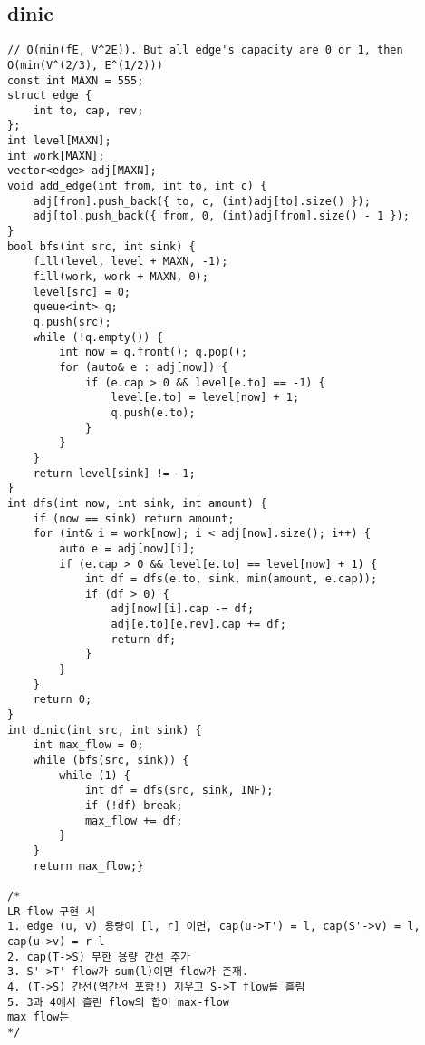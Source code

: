 \documentclass[landscape, 8pt, a4paper, oneside, twocolumn]{extarticle}
\begin{document}
\subsection {dinic}
\begin{verbatim}
// O(min(fE, V^2E)). But all edge's capacity are 0 or 1, then O(min(V^(2/3), E^(1/2)))
const int MAXN = 555;
struct edge {
    int to, cap, rev;
};
int level[MAXN];
int work[MAXN];
vector<edge> adj[MAXN];
void add_edge(int from, int to, int c) {
    adj[from].push_back({ to, c, (int)adj[to].size() });
    adj[to].push_back({ from, 0, (int)adj[from].size() - 1 });
}
bool bfs(int src, int sink) {
    fill(level, level + MAXN, -1);
    fill(work, work + MAXN, 0);
    level[src] = 0;
    queue<int> q;
    q.push(src);
    while (!q.empty()) {
        int now = q.front(); q.pop();
        for (auto& e : adj[now]) {
            if (e.cap > 0 && level[e.to] == -1) {
                level[e.to] = level[now] + 1;
                q.push(e.to);
            }
        }
    }
    return level[sink] != -1;
}
int dfs(int now, int sink, int amount) {
    if (now == sink) return amount;
    for (int& i = work[now]; i < adj[now].size(); i++) {
        auto e = adj[now][i];
        if (e.cap > 0 && level[e.to] == level[now] + 1) {
            int df = dfs(e.to, sink, min(amount, e.cap));
            if (df > 0) {
                adj[now][i].cap -= df;
                adj[e.to][e.rev].cap += df;
                return df;
            }
        }
    }
    return 0;
}
int dinic(int src, int sink) {
    int max_flow = 0;
    while (bfs(src, sink)) {
        while (1) {
            int df = dfs(src, sink, INF);
            if (!df) break;
            max_flow += df;
        }
    }
    return max_flow;}

/*
LR flow 구현 시
1. edge (u, v) 용량이 [l, r] 이면, cap(u->T') = l, cap(S'->v) = l, cap(u->v) = r-l
2. cap(T->S) 무한 용량 간선 추가
3. S'->T' flow가 sum(l)이면 flow가 존재.
4. (T->S) 간선(역간선 포함!) 지우고 S->T flow를 흘림
5. 3과 4에서 흘린 flow의 합이 max-flow
max flow는 
*/

\end{verbatim}
\newpage
\end{document}
